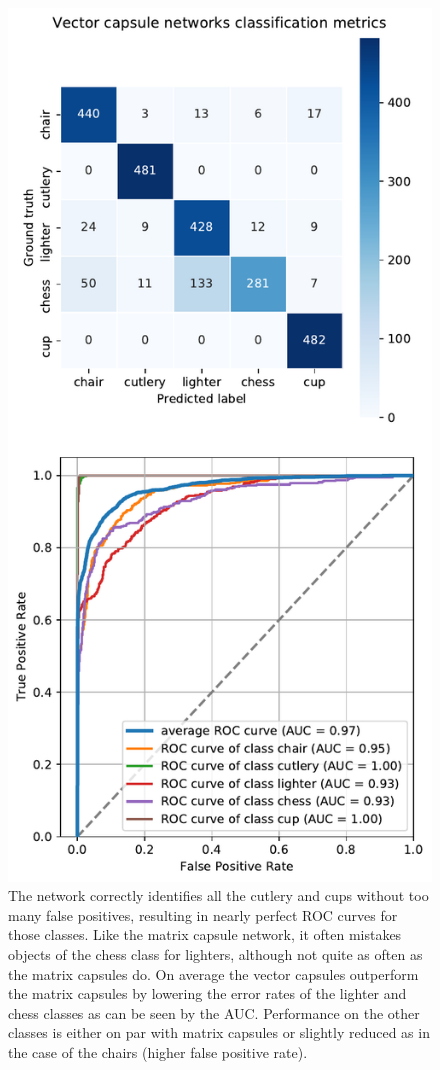 \begin{figure}[H]
    \centering
\includegraphics[width=.59\textwidth]{figures/roc_vector.pdf}
\caption[Classification metrics for the vector capsule network]{The network correctly identifies all the cutlery and cups without too many false positives, resulting in nearly perfect ROC curves for those classes. Like the matrix capsule network, it often mistakes objects of the chess class for lighters, although not quite as often as the matrix capsules do. On average the vector capsules outperform the matrix capsules by lowering the error rates of the lighter and chess classes as can be seen by the AUC. Performance on the other classes is either on par with matrix capsules or slightly reduced as in the case of the chairs (higher false positive rate).}\label{fig:roc-vector}
\end{figure}\newpage\noindent
